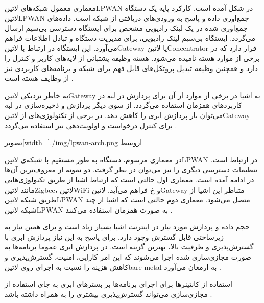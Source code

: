 
معماری معمول شبکه‌های ‌لاتین{LPWAN} در شکل  آمده است.
کارکرد پایه یک دستگاه ‌لاتین{LPWAN} جمع‌اوری داده و پاسخ به ورودی‌های دریافتی از شبکه است.
داده‌های جمع‌اوری شده در یک لینک رادیویی مشخص برای ایستگاه دسترسی بی‌سیم ارسال می‌گردد.
ایستگاه بی‌سیم لینک رادیویی، برای مدیریت دستگاه و تبادل اطلاعات فراهم می‌آورد.
این ایستگاه در ارتباط با ‌لاتین{Gateway} یا ‌لاتین{Concentrator} قرار دارد که در برخی از موارد هسته نامیده می‌شود.
هسته وظیفه پشتبانی از لایه‌های کاربر و کنترل را دارد و همچنین وظیفه تبدیل پروتکل‌های قابل فهم برای شبکه و برنامه‌های کاربردی نیز از وظایف هسته است
.

به خاطر نزدیکی ‌لاتین{Gateway} به اشیا در برخی از موارد از آن برای پردازش در لبه در کاربردهای همزمان استفاده می‌گردد.
از سوی دیگر پردازش و ذخیره‌سازی در لبه می‌توان بار پردازش ابری را کاهش دهد. در برخی از تکنولوژی‌های
از ‌لاتین{Gateway} برای کنترل درخواست و اولویت‌دهی نیز استفاده می‌گردد
.

‌تصویر[width=\textwidth]{./img/lpwan-arch.png}
‌ازوسط

در معماری مرسوم، دستگاه به طور مستقیم با شبکه‌ی ‌لاتین{LPWAN} در ارتباط است.
تنظیمات دسترسی دیگری را نیز می‌توان در نظر گرفت. دو نمونه از معروف‌ترین آن‌ها
در ادامه آمده است.
معماری اول حالتی است که ارتباط اشیا از طریق تکنولوژی‌هایی مانند ‌لاتین{Zigbee}،
‌لاتین{WiFi} و ‌خ فراهم می‌آید. ‌لاتین{Gateway} متناظر این اشیا از طریق
شبکه ‌لاتین{LPWAN} متصل می‌شود.
معماری دوم حالتی است که اشیا از چند شبکه ‌لاتین{LPWAN} به صورت همزمان استفاده می‌کنند
.


حجم داده و پردازش مورد نیاز در اینترنت اشیا بسیار زیاد است و برای همین نیاز به زیرساختی قابل گسترش وجود دارد.
برای پاسخ به این نیاز پردازش ابری با گسترش‌پذیری و ظرفیت بالا، بهترین گزینه است.
در پردازش ابری عموما برنامه‌ها به صورت مجازی‌سازی شده اجرا می‌شوند که این امر کارایی، امنیت، گسترش‌پذیری و کاهش هزینه
را نسبت به اجرای روی ‌لاتین{bare-metal} به ارمغان می‌آورد
.

استفاده از کانتینرها برای اجرای برنامه‌ها بر بسترهای ابری به جای استفاده از مجازی‌سازی می‌تواند گسترش‌پذیری
بیشتری را به همراه داشته باشد
.

